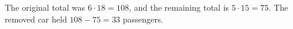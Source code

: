 The original total was $6\cdot18=108$, and the remaining total is $5\cdot15=75$. The removed car held $108-75=\boxed{33}$ passengers.
